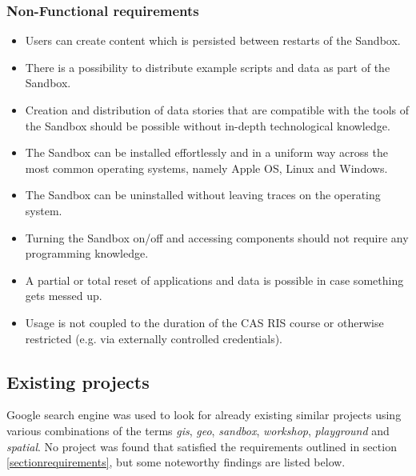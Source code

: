 \documentclass[11pt, a4paper, oneside, parskip=full-]{scrartcl}
\begin{document}
\subsubsection{Non-Functional requirements}
\begin{itemize}
  \item Users can create content which is persisted between restarts of the
  Sandbox.
  \item There is a possibility to distribute example scripts and data as part of
  the Sandbox.
  \item Creation and distribution of data stories that are compatible with the
  tools of the Sandbox should be possible without in-depth technological
  knowledge.
  \item The Sandbox can be installed effortlessly and in a uniform way across
  the most common operating systems, namely Apple OS, Linux and Windows.
  \item The Sandbox can be uninstalled without leaving traces on the operating
  system.
  \item Turning the Sandbox on/off and accessing components should not require
  any programming knowledge.
  \item A partial or total reset of applications and data is possible in case
  something gets messed up.
  \item Usage is not coupled to the duration of the CAS RIS course or otherwise
  restricted (e.g. via externally controlled credentials).
\end{itemize}

\subsection{Existing projects}
Google search engine was used to look for already existing similar projects
using various combinations of the terms \emph{gis}, \emph{geo}, \emph{sandbox},
\emph{workshop}, \emph{playground} and \emph{spatial}. No project was found that
satisfied the requirements outlined in section \ref{sectionrequirements}, but
some noteworthy findings are listed below.
\end{document}
